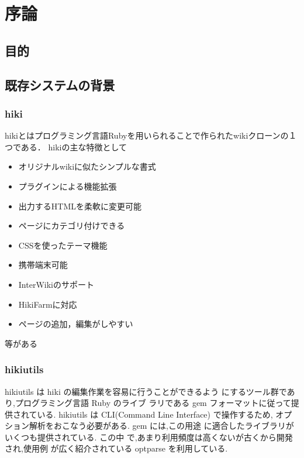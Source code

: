 \section{序論}
\subsection{目的}
\subsection{既存システムの背景}
\subsubsection{hiki}
hikiとはプログラミング言語Rubyを用いられることで作られたwikiクローンの１つである．
hikiの主な特徴として

\begin{itemize}
\item オリジナルwikiに似たシンプルな書式
\item プラグインによる機能拡張
\item 出力するHTMLを柔軟に変更可能
\item ページにカテゴリ付けできる
\item CSSを使ったテーマ機能
\item 携帯端末可能
\item InterWikiのサポート
\item HikiFarmに対応
\item ページの追加，編集がしやすい
\end{itemize}
等がある

\subsubsection{hikiutils}
hikiutils は hiki の編集作業を容易に行うことができるよう にするツール群であり,プログラミング言語 Ruby のライブ ラリである gem フォーマットに従って提供されている. 
hikiutils は CLI(Command Line Interface) で操作するため, オプション解析をおこなう必要がある. 
gem には,この用途 に適合したライブラリがいくつも提供されている. 
この中 で,あまり利用頻度は高くないが古くから開発され,使用例 が広く紹介されている optparse を利用している.

